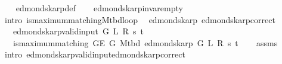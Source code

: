 \begin{isabellebody}
%
\isadelimproof
\ \ %
\endisadelimproof
%
\isatagproof
{}\isamarkupfalse%
\ edmonds{\isacharunderscore}{\kern0pt}karp{\isacharunderscore}{\kern0pt}def\isanewline
\ \ \isamarkupfalse%
\ edmonds{\isacharunderscore}{\kern0pt}karp{\isacharunderscore}{\kern0pt}invar{\isacharunderscore}{\kern0pt}empty\isanewline
\ \ \isamarkupfalse%
\ {\isacharparenleft}{\kern0pt}intro\ is{\isacharunderscore}{\kern0pt}maximum{\isacharunderscore}{\kern0pt}matching{\isacharunderscore}{\kern0pt}M{\isacharunderscore}{\kern0pt}tbd{\isacharunderscore}{\kern0pt}loop{\isacharprime}{\kern0pt}{\isacharparenright}{\kern0pt}%
\endisatagproof
{\isafoldproof}%
%
\isadelimproof
\isanewline
%
\endisadelimproof
\isanewline
{}\isamarkupfalse%
\ {\isacharparenleft}{\kern0pt}\ edmonds{\isacharunderscore}{\kern0pt}karp{\isacharparenright}{\kern0pt}\ edmonds{\isacharunderscore}{\kern0pt}karp{\isacharunderscore}{\kern0pt}correct{\isacharcolon}{\kern0pt}\isanewline
\ \ \ {\isachardoublequoteopen}edmonds{\isacharunderscore}{\kern0pt}karp{\isacharunderscore}{\kern0pt}valid{\isacharunderscore}{\kern0pt}input{\isacharprime}{\kern0pt}\ G\ L\ R\ s\ t{\isachardoublequoteclose}\isanewline
\ \ \ {\isachardoublequoteopen}is{\isacharunderscore}{\kern0pt}maximum{\isacharunderscore}{\kern0pt}matching\ {\isacharparenleft}{\kern0pt}G{\isachardot}{\kern0pt}E\ G{\isacharparenright}{\kern0pt}\ {\isacharparenleft}{\kern0pt}M{\isacharunderscore}{\kern0pt}tbd\ {\isacharparenleft}{\kern0pt}edmonds{\isacharunderscore}{\kern0pt}karp\ G\ L\ R\ s\ t{\isacharparenright}{\kern0pt}{\isacharparenright}{\kern0pt}{\isachardoublequoteclose}\isanewline
%
\isadelimproof
\ \ %
\endisadelimproof
%
\isatagproof
{}\isamarkupfalse%
\ assms\isanewline
\ \ \isamarkupfalse%
\ {\isacharparenleft}{\kern0pt}intro\ edmonds{\isacharunderscore}{\kern0pt}karp{\isacharunderscore}{\kern0pt}valid{\isacharunderscore}{\kern0pt}input{\isachardot}{\kern0pt}edmonds{\isacharunderscore}{\kern0pt}karp{\isacharunderscore}{\kern0pt}correct{\isacharparenright}{\kern0pt}%
\endisatagproof
{\isafoldproof}%
%
\isadelimproof
\isanewline
%
\endisadelimproof
%
\isadelimtheory
\isanewline
%
\endisadelimtheory
%
\isatagtheory
{}\isamarkupfalse%
%
\endisatagtheory
{\isafoldtheory}%
%
\isadelimtheory
%
\endisadelimtheory
%
\end{isabellebody}%
\endinput
